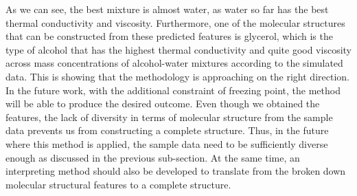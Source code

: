 As we can see, the best mixture is almost water, as water so far has the best 
thermal conductivity and viscosity. Furthermore, one of the molecular 
structures that can be constructed from these predicted features is glycerol, 
which is the type of alcohol that has the highest thermal conductivity and 
quite good viscosity across mass concentrations of alcohol-water mixtures 
according to the simulated data. This is showing that the methodology is 
approaching on the right direction. In the future work, with the additional 
constraint of freezing point, the method will be able to produce the desired 
outcome. Even though we obtained the features, the lack of diversity in terms 
of molecular structure from the sample data prevents us from constructing a 
complete structure. Thus, in the future where this method is applied, the 
sample data need to be sufficiently diverse enough as discussed in the 
previous sub-section. At the same time, an interpreting method should also be 
developed to translate from the broken down molecular structural features to 
a complete structure.